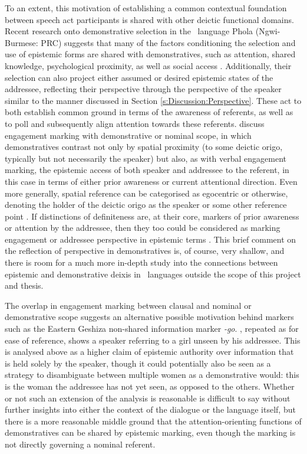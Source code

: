 To an extent, this motivation of establishing a common contextual foundation between speech act participants is shared with other deictic functional domains. Recent research onto demonstrative selection in the \lfam\ language Phola (Ngwi-Burmese: PRC) suggests that many of the factors conditioning the selection and use of epistemic forms are shared with demonstratives, such as attention, shared knowledge, psychological proximity, as well as social access \cite{GonzalezPerez2023}. Additionally, their selection can also project either assumed or desired epistemic states of the addressee, reflecting their perspective through the perspective of the speaker similar to the manner discussed in Section \ref{s:Discussion:Perspective}. These act to both establish common ground in terms of the awareness of referents, as well as to poll and subsequently align attention towards these referents.  discuss engagement marking with demonstrative or nominal scope, in which demonstratives contrast not only by spatial proximity (to some deictic origo, typically but not necessarily the speaker) but also, as with verbal engagement marking, the epistemic access of both speaker and addressee to the referent, in this case in terms of either prior awareness or current attentional direction. Even more generally, spatial reference can be categorised as egocentric or otherwise, denoting the holder of the deictic origo as the speaker or some other reference point \cite{Diessel2014}. If distinctions of definiteness are, at their core, markers of prior awareness or attention by the addressee, then they too could be considered as marking engagement or addressee perspective in epistemic terms \cite[117]{EvansBergqvistSanRoque2018a}. This brief comment on the reflection of perspective in demonstratives is, of course, very shallow, and there is room for a much more in-depth study into the connections between epistemic and demonstrative deixis in \lfam\ languages outside the scope of this project and thesis.

The overlap in engagement marking between clausal and nominal or demonstrative scope suggests an alternative possible motivation behind markers such as the Eastern Geshiza non-shared information marker \textit{-go}. , repeated as  for ease of reference, shows a speaker referring to a girl unseen by his addressee. This is analysed above as a higher claim of epistemic authority over information that is held solely by the speaker, though it could potentially also be seen as a strategy to disambiguate between multiple women as a demonstrative would: this is the woman the addressee has not yet seen, as opposed to the others. Whether or not such an extension of the analysis is reasonable is difficult to say without further insights into either the context of the dialogue or the language itself, but there is a more reasonable middle ground that the attention-orienting functions of demonstratives can be shared by epistemic marking, even though the marking is not directly governing a nominal referent.


